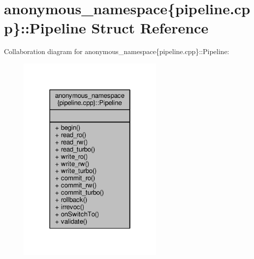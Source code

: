 \hypertarget{structanonymous__namespace_02pipeline_8cpp_03_1_1Pipeline}{\section{anonymous\-\_\-namespace\{pipeline.\-cpp\}\-:\-:Pipeline Struct Reference}
\label{structanonymous__namespace_02pipeline_8cpp_03_1_1Pipeline}
}


Collaboration diagram for anonymous\-\_\-namespace\{pipeline.\-cpp\}\-:\-:Pipeline\-:
\nopagebreak
\begin{figure}[H]
\begin{center}
\leavevmode
\includegraphics[width=202pt]{structanonymous__namespace_02pipeline_8cpp_03_1_1Pipeline__coll__graph}
\end{center}
\end{figure}
